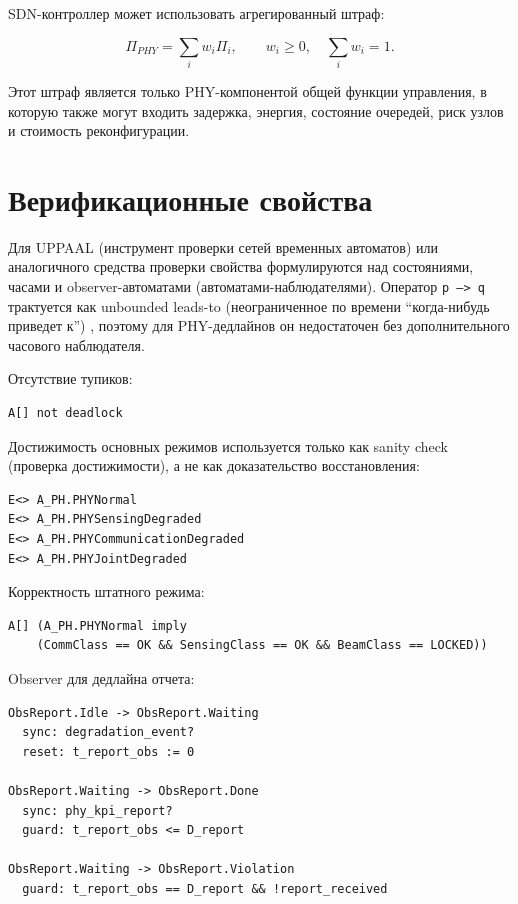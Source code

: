 \documentclass[12pt,a4paper]{article}
\begin{document}
SDN-контроллер может использовать агрегированный штраф:

\begin{equation}
\Pi_{PHY}=\sum_i w_i\Pi_i,
\qquad
w_i\ge 0,\quad \sum_i w_i=1.
\end{equation}

Этот штраф является только PHY-компонентой общей функции управления, в которую также могут входить задержка, энергия, состояние очередей, риск узлов и стоимость реконфигурации.

\section{Верификационные свойства}

Для UPPAAL (инструмент проверки сетей временных автоматов) или аналогичного средства проверки свойства формулируются над состояниями, часами и observer-автоматами (автоматами-наблюдателями). Оператор \texttt{p --> q} трактуется как unbounded leads-to (неограниченное по времени ``когда-нибудь приведет к'') \cite{uppaaldocs}, поэтому для PHY-дедлайнов он недостаточен без дополнительного часового наблюдателя.

Отсутствие тупиков:

\begin{verbatim}
A[] not deadlock
\end{verbatim}

Достижимость основных режимов используется только как sanity check (проверка достижимости), а не как доказательство восстановления:

\begin{verbatim}
E<> A_PH.PHYNormal
E<> A_PH.PHYSensingDegraded
E<> A_PH.PHYCommunicationDegraded
E<> A_PH.PHYJointDegraded
\end{verbatim}

Корректность штатного режима:

\begin{verbatim}
A[] (A_PH.PHYNormal imply
    (CommClass == OK && SensingClass == OK && BeamClass == LOCKED))
\end{verbatim}

Observer для дедлайна отчета:

\begin{verbatim}
ObsReport.Idle -> ObsReport.Waiting
  sync: degradation_event?
  reset: t_report_obs := 0

ObsReport.Waiting -> ObsReport.Done
  sync: phy_kpi_report?
  guard: t_report_obs <= D_report

ObsReport.Waiting -> ObsReport.Violation
  guard: t_report_obs == D_report && !report_received
\end{verbatim}
\end{document}
